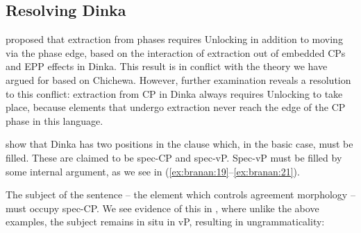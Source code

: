 \documentclass[output=paper,colorlinks,citecolor=brown]{langscibook}
\begin{document}
\subsection{Resolving Dinka}\label{sec:branan:5.2}

\citet{VanUrkRichards2015} proposed that extraction from phases requires Unlocking in addition to moving via the phase edge, based on the interaction of extraction out of embedded CPs and EPP effects in Dinka. This result is in conflict with the theory we have argued for based on Chichewa. However, further examination reveals a resolution to this conflict: extraction from CP in Dinka always requires Unlocking to take place, because elements that undergo extraction never reach the edge of the CP phase in this language.

\citeauthor{VanUrkRichards2015} show that Dinka has two positions in the clause which, in the basic case, must be filled. These are claimed to be spec-CP and spec-vP. Spec-vP must be filled by some internal argument, as we see in (\ref{ex:branan:19}--\ref{ex:branan:21}).

\ea[]{%
    \label{ex:branan:19}
    Dinka spec-vP filled by DO \hfill{(\citealt[ex. 33b]{VanUrkRichards2015})}\\
    \gll    B\`{o}l a-c\'{i} [$_{vP}$ alk\'{o}k\^{o}l$_{k}$  lɛ̤́k  D\`{ɛ}ŋ \_$_{k}$. \\
            Bol \textsc{3sg-pfv} \,  story tell Deng \\
    \glt    `Bol told Deng a story.'}
\z

The subject of the sentence -- the element which controls agreement morphology -- must occupy spec-CP. We see evidence of this in , where unlike the above examples, the subject remains in situ in vP, resulting in ungrammaticality:
\end{document}
